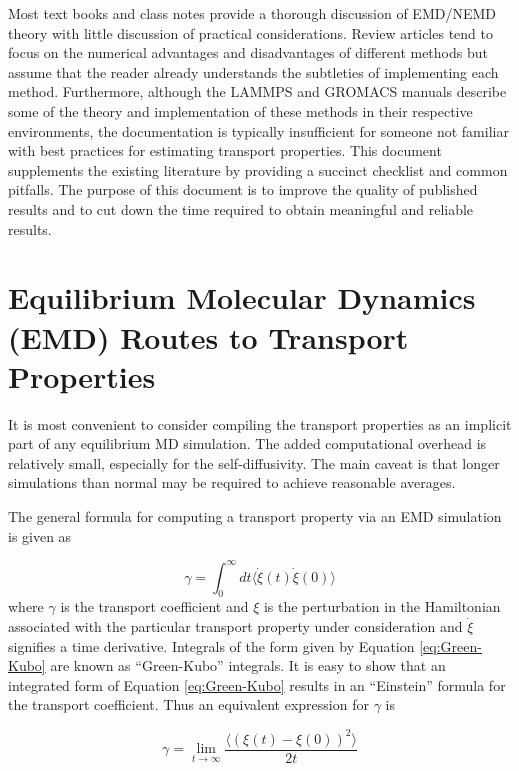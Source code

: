 \documentclass[9pt]{livecoms}
\begin{document}
Most text books and class notes provide a thorough discussion of EMD/NEMD theory with little discussion of practical considerations. Review articles tend to focus on the numerical advantages and disadvantages of different methods but assume that the reader already understands the subtleties of implementing each method. Furthermore, although the LAMMPS and GROMACS manuals describe some of the theory and implementation of these methods in their respective environments, the documentation is typically insufficient for someone not familiar with best practices for estimating transport properties. This document supplements the existing literature by providing a succinct checklist and common pitfalls. The purpose of this document is to improve the quality of published results and to cut down the time required to obtain meaningful and reliable results. %

\section{Equilibrium Molecular Dynamics (EMD) Routes to Transport Properties}

It is most convenient to consider compiling the transport properties as an implicit part of any equilibrium MD simulation. The added computational overhead is relatively small, especially for the self-diffusivity. The main caveat is that longer simulations than normal may be required to achieve reasonable averages. 

The general formula for computing a transport property via an EMD simulation is given as

\begin{equation} \label{eq:Green-Kubo}
\gamma = \int_{0}^{\infty}dt\langle\dot{\xi}(t)\dot{\xi}(0)\rangle
\end{equation}
where $\gamma$ is the transport coefficient and $\xi$ is the perturbation in the Hamiltonian associated with the particular transport property under consideration and $\dot{\xi}$ signifies a time derivative. Integrals of the form given by Equation \ref{eq:Green-Kubo} are known as “Green-Kubo” integrals. It is easy to show that an integrated form of Equation \ref{eq:Green-Kubo} results in an “Einstein” formula for the transport coefficient. Thus an equivalent expression for $\gamma$ is

\begin{equation} \label{eq:Einstein}
\gamma = \lim_{t\to\infty} \frac{\langle (\xi(t)-\xi(0))^2 \rangle}{2t}
\end{equation}
\end{document}
